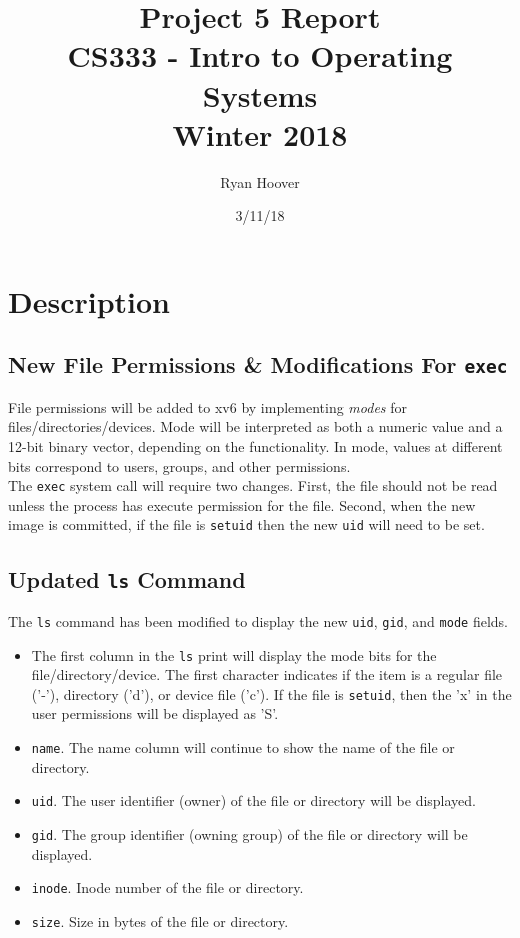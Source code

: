 \documentclass[11pt,letterpaper]{report}
\author{Ryan Hoover}
\title{Project 5 Report\\CS333 - Intro to Operating Systems\\Winter 2018}
\date{3/11/18}
\begin{document}
	\maketitle{}
	\section{Description}
	
	\subsection{New File Permissions \& Modifications For {\tt  exec}}
	
	File permissions will be added to xv6 by implementing \emph{modes} for files/directories/devices. Mode will be interpreted as both a numeric value and a 12-bit binary vector, depending on the functionality. In mode, values at different bits correspond to users, groups, and other permissions.\\
	The {\tt exec} system call will require two changes. First, the file should not be read unless the process has execute permission for the file. Second, when the new image is committed, if the file is {\tt setuid} then the new {\tt uid} will need to be set.
	
	\subsection{Updated {\tt ls} Command}
	The {\tt ls} command has been modified to display the new {\tt uid}, {\tt gid}, and {\tt mode} fields.
	\begin{itemize}
		\item The first column in the {\tt ls} print will display the mode bits for the file/directory/device. The first character indicates if the item is a regular file ('-'), directory ('d'), or device file ('c'). If the file is {\tt setuid}, then the 'x' in the user permissions will be displayed as 'S'.
		\item {\tt name}. The name column will continue to show the name of the file or directory.
		\item {\tt uid}. The user identifier (owner) of the file or directory will be displayed.
		\item {\tt gid}. The group identifier (owning group) of the file or directory will be displayed.
		\item {\tt inode}. Inode number of the file or directory.
		\item {\tt size}. Size in bytes of the file or directory.
	\end{itemize}
	
\end{document}
